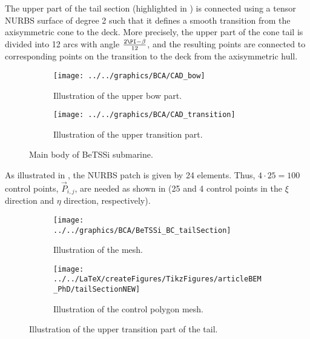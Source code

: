 The upper part of the tail section (highlighted in ) is connected using a tensor NURBS surface of degree 2 such that it defines a smooth transition from the axisymmetric cone to the deck. More precisely, the upper part of the cone tail is divided into 12 arcs with angle $\frac{2\PI-\beta}{12}$, and the resulting points are connected to corresponding points on the transition to the deck from the axisymmetric hull. 
\begin{figure}
	\centering    
	\begin{subfigure}{0.49\textwidth}
		\centering
		\texttt{[image: ../../graphics/BCA/CAD\_bow]}
		\caption{Illustration of the upper bow part.}
		\label{Fig3:bettsi_upperBow}
	\end{subfigure}%
	\hspace*{0.02\textwidth}%
	\begin{subfigure}{0.49\textwidth}
		\centering
		\texttt{[image: ../../graphics/BCA/CAD\_transition]}
		\caption{Illustration of the upper transition part.}
		\label{Fig3:bettsi_upperPartOfTailSection}
	\end{subfigure}
	\caption{Main body of BeTSSi submarine.}
\end{figure}
As illustrated in , the NURBS patch is given by 24 elements. Thus, $4\cdot 25 = 100$ control points, $\vec{P}_{i,j}$, are needed as shown in  (25 and 4 control points in the $\xi$ direction and $\eta$ direction, respectively).
\begin{figure}
	\centering    
	\begin{subfigure}{0.49\textwidth}
		\centering
		\texttt{[image: ../../graphics/BCA/BeTSSi\_BC\_tailSection]}
		\caption{Illustration of the mesh.}
		\label{Fig3:BeTSSi_BC_tailSection}
	\end{subfigure}%
	\hspace*{0.02\textwidth}%
	\begin{subfigure}{0.49\textwidth}
		\centering
		\texttt{[image: ../../LaTeX/createFigures/TikzFigures/articleBEM\_PhD/tailSectionNEW]}
		\caption{Illustration of the control polygon mesh.}
		\label{Fig3:BeTSSi_BC_tailSection_cp}
	\end{subfigure}
	\caption{Illustration of the upper transition part of the tail.}
\end{figure}
